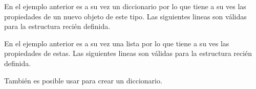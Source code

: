 \documentclass[a5paper,9pt,spanish]{sphinxmanual}
\begin{document}
\sphinxAtStartPar
En el ejemplo anterior  es a su vez un diccionario por lo que
tiene a su ves las propiedades de un nuevo objeto de este tipo.
Las siguientes lineas son válidas para la estructura recién definida.

\begin{sphinxVerbatim}[commandchars=\\\{\}]
\PYG{p}{[}\PYG{p}{]}\PYG{p}{[}\PYG{p}{]}

 \PYG{p}{[}\PYG{p}{]}\PYG{p}{[}\PYG{p}{]}
\end{sphinxVerbatim}

\sphinxAtStartPar
En el ejemplo anterior  es a
su vez una lista por lo que tiene a su ves las propiedades de estas.
Las siguientes lineas son válidas para la estructura recién definida.

\begin{sphinxVerbatim}[commandchars=\\\{\}]
   \PYG{p}{[}\PYG{p}{]}\PYG{p}{[}\PYG{p}{]}\PYG{p}{[}\PYG{p}{]}
\end{sphinxVerbatim}

\sphinxAtStartPar
También es posible usar  para crear un diccionario.
\end{document}
